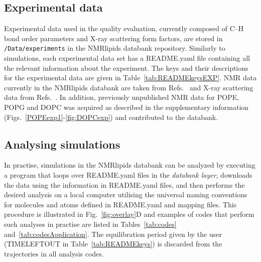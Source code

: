 \documentclass[fleqn,10pt]{wlscirep}
\begin{document}
\subsection{Experimental data}
Experimental data used in the quality evaluation, currently composed of C--H bond order parameters and X-ray scattering form factors, are stored in \texttt{/Data/experiments} in the NMRlipids databank repository. Similarly to simulations, each experimental data set has a README.yaml file containing all the relevant information about the experiment. The keys and their descriptions for the experimental data are given in Table~\ref{tab:READMEkeysEXP}. NMR data currently in the NMRlipids databank are taken from Refs.~ and X-ray scattering data from Refs.~. In addition, previously unpublished NMR data for POPE, POPG and DOPC was acquired as described in the supplementary information (Figs.~\ref{POPEexp1}-\ref{fig:DOPCexp}) and contributed to the databank. 


\subsection{Analysing simulations}
In practise, simulations in the NMRlipids databank can be analyzed by executing a program that loops over README.yaml files in the {\it databank layer}, downloads the data using the information in README.yaml files, and then performs the desired analysis on a local computer utilising the universal naming conventions for molecules and atoms defined in README.yaml and mapping files. This procedure is illustrated in Fig.~\ref{fig:overlay}D and examples of codes that perform such analyses in practise are listed in Tables~\ref{tab:codes} and~\ref{tab:codesApplication}. The equilibration period given by the user (TIMELEFTOUT in Table~\ref{tab:READMEkeys}) is discarded from the trajectories in all analysis codes.
\end{document}
